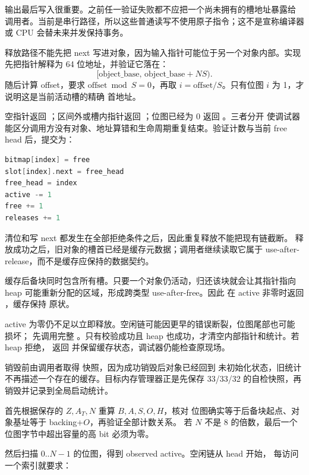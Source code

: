 输出最后写入很重要。之前任一验证失败都不应把一个尚未拥有的槽地址暴露给
调用者。当前是串行路径，所以这些普通读写不使用原子指令；这不是宣称编译器
或 CPU 会替未来并发保持事务。

释放路径不能先把 next 写进对象，因为输入指针可能位于另一个对象内部。实现
先把指针解释为 64 位地址，并验证它落在：
\[
  [\mathrm{object\_base},\,
    \mathrm{object\_base}+N S).
\]
随后计算 offset，要求 \(\mathrm{offset}\bmod S=0\)，再取
\(i=\mathrm{offset}/S\)。只有位图 \(i\) 为 1，才说明这是当前活动槽的精确
首地址。

空指针返回 ；区间外或槽内指针返回
；位图已经为 0 返回 。三者分开
使调试器能区分调用方没有对象、地址算错和生命周期重复结束。验证计数与当前
free head 后，提交为：

\begin{lstlisting}[language=C++]
bitmap[index] = free
slot[index].next = free_head
free_head = index
active -= 1
free += 1
releases += 1
\end{lstlisting}

清位和写 next 都发生在全部拒绝条件之后，因此重复释放不能把现有链截断。
释放成功之后，旧对象的槽首已经是缓存元数据；调用者继续读取它属于 use-after-
release，而不是缓存应保持的数据契约。

缓存后备块同时包含所有槽。只要一个对象仍活动，归还该块就会让其指针指向
heap 可能重新分配的区域，形成跨类型 use-after-free。因此
 在 active 非零时返回 ，缓存保持
原状。

active 为零仍不足以立即释放。空闲链可能因更早的错误断裂，位图尾部也可能
损坏； 先调用完整 。只有校验成功且 heap
 也成功，才清空内部指针和统计。若 heap 拒绝，
返回  并保留缓存状态，调试器仍能检查原现场。

销毁前由调用者取得  快照，因为成功销毁后对象已经回到
未初始化状态，旧统计不再描述一个存在的缓存。目标内存管理器正是先保存
33/33/32 的自检快照，再销毁并记录到全局启动统计。

 首先根据保存的 \(Z,A_T,N\) 重算 \(B,A,S,O,H\)，核对
位图确实等于后备块起点、对象基址等于 backing+\(O\)，再验证全部计数关系。
若 \(N\) 不是 8 的倍数，最后一个位图字节中超出容量的高 bit 必须为零。

然后扫描 \(0..N-1\) 的位图，得到 observed active。空闲链从 head 开始，
每访问一个索引就要求：

